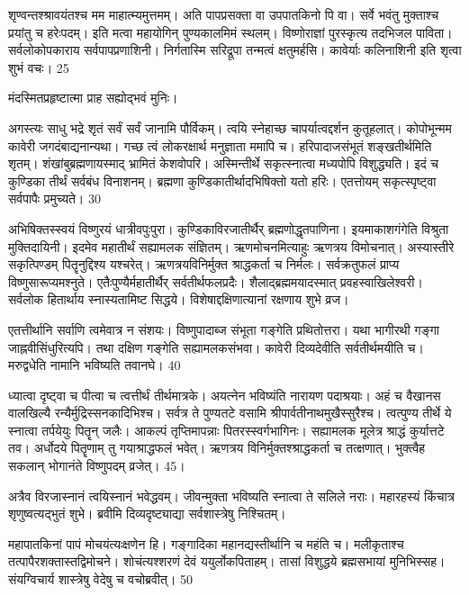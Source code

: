 शृण्वन्तश्श्रावयंतश्च मम माहात्म्यमुत्तमम्।
अति पापप्रसक्ता वा उपपातकिनो पि वा।
सर्वे भवंतु मुक्ताश्च प्रयांतु च हरेःपदम्।
इति मत्वा महायोगिन् पुण्यकालमिमं स्थलम्।
विष्णोराज्ञां पुरस्कृत्य तदभिजल पाविता।
सर्वलोकोपकाराय सर्वपापप्रणाशिनी।
निर्गतास्मि सरिद्रूपा तन्मत्वं क्षतुमर्हसि।
कावेर्याः कलिनाशिनी इति शृत्वा शुभं वचः।
25

मंदस्मितप्रहृष्टात्मा प्राह सह्योद्भवं मुनिः।

अगस्त्यः
साधु भद्रे शृतं सर्वं सर्वं जानामि पौर्विकम्।
त्वयि स्नेहाच्छ चापर्यात्वद्दर्शन कुतूहलात्।
कोपोभून्मम कावेरी जगदंबाद्यनान्यथा।
गच्छ त्वं लोकरक्षार्थ मनुज्ञाता ममापि च।
हरिपादाजसंभूतं शङ्खतीर्थमिति शृतम्।
शंखांबुब्रह्मणायस्माद् भ्रामितं केशवोपरि।
अस्मिन्तीर्थे सकृत्स्नात्वा मध्यपोपि विशुद्ध्यति।
इदं च कुण्डिका तीर्थं सर्वबंध विनाशनम्।
ब्रह्मणा कुण्डिकातीर्थादभिषिक्तो यतो हरिः।
एतत्तोयम् सकृत्स्पृष्ट्वा सर्वपापैः प्रमुच्यते।
30

अभिषिक्तस्स्वयं विष्णुरयं धात्रीवपुःपुरा।
कुण्डिकाविरजातीर्थैर् ब्रह्मणोद्धृतपाणिना।
इयमाकाशगंगेति विश्रुता मुक्तिदायिनी।
इदमेव महातीर्थं सह्यामलक संज्ञितम्।
ऋणमोचनमित्याहुः ऋणत्रय विमोचनात्।
अस्यास्तीरे सकृत्पिण्डम् पितॄनुद्दिश्य यश्चरेत्।
ऋणत्रयविनिर्मुक्त श्राद्धकर्ता च निर्मलः।
सर्वक्रतुफलं प्राप्य विष्णुसारूप्यमश्नुते।
एतैःपुण्यैर्महातीर्थैर् सर्वतीर्थफलप्रदैः।
शैलाद्ब्रह्ममयादस्मात् प्रवहस्वाखिलेश्वरी।
सर्वलोक हितार्थाय स्नास्यतामिष्ट सिद्धये।
विशेषाद्दक्षिणात्यानां रक्षणाय शुभे व्रज।

एतत्तीर्थानि सर्वाणि त्वमेवात्र न संशयः।
विष्णुपादाब्ज संभूता गङ्गेति प्रथितोत्तरा।
यथा भागीरथी गङ्गा जाह्नवीसिंधुरित्यपि।
तथा दक्षिण गङ्गेति सह्यामलकसंभवा।
कावेरी दिव्यदेवीति सर्वतीर्थमयीति च।
मरुद्वधेति नामानि भविष्यति तवानघे।
40

ध्यात्वा दृष्ट्वा च पीत्वा च त्वत्तीर्थं तीर्थमात्रके।
अयत्नेन भविष्यंति नारायण पदाश्रयाः।
अहं च वैखानस वालखिल्यै
रन्यैर्मुद्रिस्सनकादिभिश्च।
सर्वत्र ते पुण्यतटे वसामि
श्रीपार्वतीनाथमुखैस्सुरैश्च।
त्वत्पुण्य तीर्थे ये स्नात्वा तर्पयेयुः पितॄन् जलैः।
आकल्पं तृप्तिमापन्नाः पितरस्स्वर्गभागिनः।
सह्यामलक मूलेत्र श्राद्धं कुर्यात्तटे तव।
अर्धोदये पितॄणाम् तु गयाश्राद्धफलं भवेत्।
ऋणत्रय विनिर्मुक्तश्श्राद्धकर्ता च तत्क्षणात्।
भुक्त्वैह सकलान् भोगानंते विष्णुपदम् व्रजेत्।
45।


अत्रैव विरजास्नानं त्वयिस्नानं भवेद्धवम्।
जीवन्मुक्ता भविष्यति स्नात्वा ते सलिले नराः।
महारहस्यं किंचात्र शृणुष्वत्यद्भुतं शुभे।
ब्रवीमि दिव्यदृष्ट्याद्या सर्वशास्त्रेषु निश्चितम्।

महापातकिनां पापं मोचयंत्यःक्षणेन हि।
गङ्गादिका महानद्यस्तीर्थानि च महंति च।
मलीकृताश्च तत्पापैरशक्तास्तद्विमोचने।
शोचंत्यश्शरणं देवं ययुर्लोकपिताहम्।
तासां विशुद्धये ब्रह्मसभायां मुनिभिस्सह।
संयग्विचार्य शास्त्रेषु वेदेषु च वचोब्रवीत्।
50

